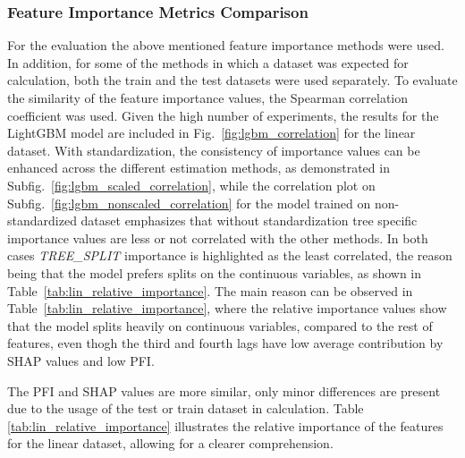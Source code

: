 \subsubsection{Feature Importance Metrics Comparison} \label{subsec:feature_importance_metrics_comparison}

For the evaluation the above mentioned feature importance methods were used.
In addition, for some of the methods in which a dataset was expected for calculation, both the train and the test datasets were used separately.
To evaluate the similarity of the feature importance values, the Spearman correlation coefficient was used.
Given the high number of experiments, the results for the LightGBM model are included in Fig.~\ref{fig:lgbm_correlation} for the linear dataset.
With standardization, the consistency of importance values can be enhanced across the different estimation methods,
as demonstrated in Subfig.~\ref{fig:lgbm_scaled_correlation}, while the correlation plot on Subfig.~\ref{fig:lgbm_nonscaled_correlation} for the model trained on non-standardized dataset emphasizes that without standardization tree specific importance values are less or not correlated with the other methods.
In both cases \emph{TREE\_SPLIT} importance is highlighted as the least correlated, the reason being that the model prefers splits on the continuous variables, as shown in Table~\ref{tab:lin_relative_importance}.
The main reason can be observed in Table~\ref{tab:lin_relative_importance}, where the relative importance values show that the model splits heavily on continuous variables, compared to the rest of features, even thogh the third and fourth lags have low average contribution by SHAP values and low PFI.

The PFI and SHAP values are more similar, only minor differences are present due to the usage of the test or train dataset in calculation.
Table \ref{tab:lin_relative_importance} illustrates the relative importance of the features for the linear dataset, allowing for a clearer comprehension.


